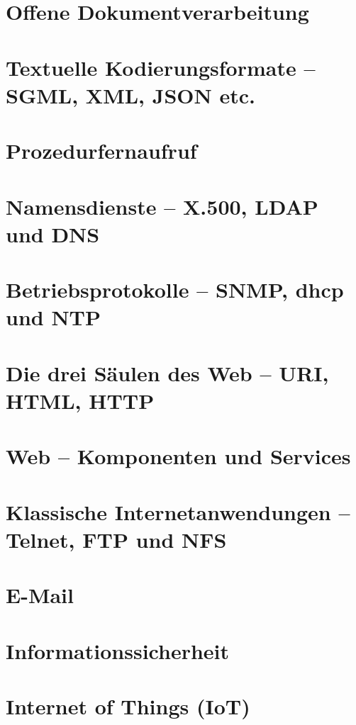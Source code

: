 \documentclass[hidelinks]{article}
\begin{document}
\section{Offene Dokumentverarbeitung}

\section{Textuelle Kodierungsformate -- SGML, XML, JSON etc.}

\section{Prozedurfernaufruf}

\section{Namensdienste -- X.500, LDAP und DNS}

\section{Betriebsprotokolle -- SNMP, dhcp und NTP}

\section{Die drei Säulen des Web -- URI, HTML, HTTP}

\section{Web -- Komponenten und Services}

\section{Klassische Internetanwendungen -- Telnet, FTP und NFS}

\section{E-Mail}

\section{Informationssicherheit}

\section{Internet of Things (IoT)}
\end{document}
